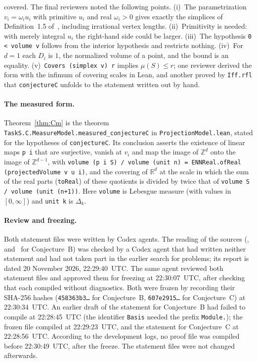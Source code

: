 \documentclass[11pt]{article}
\theoremstyle{definition}
\theoremstyle{remark}
\newcommand{\R}{\mathbb R}
\newcommand{\Z}{\mathbb Z}
\begin{document}
{covered. The final reviewers noted the following points. (i)~The
parametrization $v_i=\omega_iu_i$ with primitive $u_i$ and real $\omega_i>0$
gives exactly the simplices of Definition~1.5 of~\cite{css}, including
irrational vertex lengths. (ii)~Primitivity is needed: with merely integral
$u_i$ the right-hand side could be larger. (iii)~The hypothesis
\texttt{0 < volume v} follows from the interior hypothesis and restricts
nothing. (iv)~For $d=1$ each $D_i$ is $1$, the normalized volume of a point,
and the bound is an equality. (v)~\texttt{Covers (simplex v) r} implies
$\mu(S)\le r$; one reviewer derived the form with the infimum of covering
scales in Lean, and another proved by \texttt{Iff.rfl} that
\texttt{conjectureC} unfolds to the statement written out by hand.

\paragraph{The measured form.} Theorem~\ref{thm:Cm} is the theorem
\texttt{TaskS.C.MeasureModel.measured\_\allowbreak conjectureC} in
\texttt{ProjectionModel.lean}, stated for the hypotheses of
\texttt{conjectureC}. Its conclusion asserts the existence of linear maps
\texttt{p i} that are surjective, vanish at $v_i$ and map the image of $\Z^d$
onto the image of $\Z^{d-1}$, with
\texttt{volume (p i \textquotesingle\textquotesingle{} S) / volume (unit n) = ENNReal.ofReal (projectedVolume v u i)},
and the covering of $\R^d$ at the scale in which the sum of the real parts
(\texttt{toReal}) of these quotients is divided by twice that of
\texttt{volume S / volume (unit (n+1))}. Here \texttt{volume} is Lebesgue
measure (with values in $[0,\infty]$) and \texttt{unit k} is $\Delta_k$.

\paragraph{Review and freezing.}
Both statement files were written by Codex agents. The reading of the sources
(\cite{css}, and~\cite{gms} for Conjecture~B) was checked by a Codex agent that
had written neither statement and had not taken part in the earlier search for
problems; its report is dated 20 November 2026, 22:29:40~UTC. The same agent
reviewed both statement files and approved them for freezing at
22:30:07~UTC, after checking that each compiled without diagnostics. Both were
frozen by recording their SHA-256 hashes (\texttt{458363b3\ldots} for
Conjecture~B, \texttt{607e2915\ldots} for Conjecture~C) at 22:30:34~UTC. An
earlier draft of the statement for Conjecture~B had failed to compile at
22:28:45~UTC (the identifier \texttt{Basis} needed the prefix
\texttt{Module.}); the frozen file compiled at 22:29:23~UTC, and the statement
for Conjecture~C at 22:28:56~UTC. According to the development logs, no proof
file was compiled before 22:30:49~UTC, after the freeze. The statement files
were not changed afterwards.

}
\end{document}
